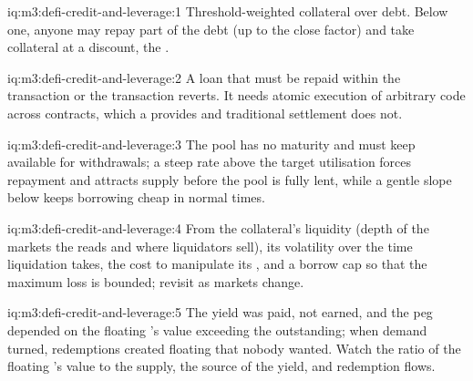 \begin{solution}{iq:m3:defi-credit-and-leverage:1}
Threshold-weighted collateral over debt. Below one, anyone may repay part of the debt (up to the close factor) and take collateral at a discount, the
.
\end{solution}

\begin{solution}{iq:m3:defi-credit-and-leverage:2}
A loan that must be repaid within the transaction or the transaction reverts. It needs atomic execution of arbitrary code across contracts, which a
 provides and traditional settlement does not.
\end{solution}

\begin{solution}{iq:m3:defi-credit-and-leverage:3}
The pool has no maturity and must keep  available for withdrawals; a steep rate above the target utilisation forces repayment and attracts supply
before the pool is fully lent, while a gentle slope below keeps borrowing cheap in normal times.
\end{solution}

\begin{solution}{iq:m3:defi-credit-and-leverage:4}
From the collateral's liquidity (depth of the markets the  reads and where liquidators sell), its volatility over the time liquidation takes, the
cost to manipulate its , and a borrow cap so that the maximum loss is bounded; revisit as markets change.
\end{solution}

\begin{solution}{iq:m3:defi-credit-and-leverage:5}
The yield was paid, not earned, and the peg depended on the floating 's value exceeding the  outstanding; when demand turned, redemptions
created floating  that nobody wanted. Watch the ratio of the floating 's value to the  supply, the source of the yield, and redemption
flows.
\end{solution}

